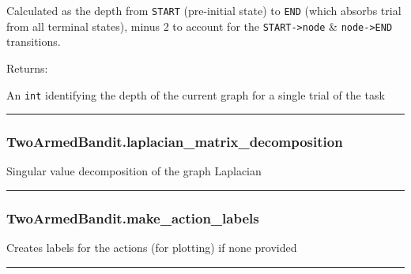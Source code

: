 Calculated as the depth from \texttt{START} (pre-initial state) to
\texttt{END} (which absorbs trial from all terminal states), minus 2 to
account for the \texttt{START-\textgreater{}node} \&
\texttt{node-\textgreater{}END} transitions.

Returns:

An \texttt{int} identifying the depth of the current graph for a single
trial of the task

\begin{center}\rule{0.5\linewidth}{\linethickness}\end{center}

\hypertarget{twoarmedbandit.laplacian_matrix_decomposition}{%
\subsubsection{TwoArmedBandit.laplacian\_matrix\_decomposition}\label{twoarmedbandit.laplacian_matrix_decomposition}}

\begin{Shaded}
\begin{Highlighting}[]
\NormalTok{)}
\end{Highlighting}
\end{Shaded}

Singular value decomposition of the graph Laplacian

\begin{center}\rule{0.5\linewidth}{\linethickness}\end{center}

\hypertarget{twoarmedbandit.make_action_labels}{%
\subsubsection{TwoArmedBandit.make\_action\_labels}\label{twoarmedbandit.make_action_labels}}

\begin{Shaded}
\begin{Highlighting}[]
\NormalTok{)}
\end{Highlighting}
\end{Shaded}

Creates labels for the actions (for plotting) if none provided

\begin{center}\rule{0.5\linewidth}{\linethickness}\end{center}

